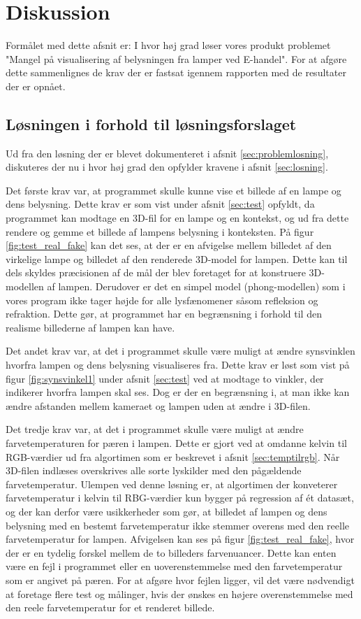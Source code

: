 \section{Diskussion}
\label{sec:diskussion}

Formålet med dette afsnit er: I hvor høj grad løser vores produkt problemet "Mangel på visualisering af belysningen fra lamper ved E-handel". For at afgøre dette sammenlignes de krav der er fastsat igennem rapporten med de resultater der er opnået. 

\subsection{Løsningen i forhold til løsningsforslaget}

Ud fra den løsning der er blevet dokumenteret i afsnit \ref{sec:problemlosning}, diskuteres der nu i hvor høj grad den opfylder kravene i afsnit \ref{sec:losning}. 

Det første krav var, at programmet skulle kunne vise et billede af en lampe og dens belysning. Dette krav er som vist under afsnit \ref{sec:test} opfyldt, da programmet kan modtage en 3D-fil for en lampe og en kontekst, og ud fra dette rendere og gemme et billede af lampens belysning i konteksten. På figur \ref{fig:test_real_fake} kan det ses, at der er en afvigelse mellem billedet af den virkelige lampe og billedet af den renderede 3D-model for lampen. Dette kan til dels skyldes præcisionen af de mål der blev foretaget for at konstruere 3D-modellen af lampen. Derudover er det en simpel model (phong-modellen) som i vores program ikke tager højde for alle lysfænomener såsom refleksion og refraktion. Dette gør, at programmet har en begrænsning i forhold til den realisme billederne af lampen kan have.

Det andet krav var, at det i programmet skulle være muligt at ændre synsvinklen hvorfra lampen og dens belysning visualiseres fra. Dette krav er løst som vist på figur \ref{fig:synsvinkel1} under afsnit \ref{sec:test} ved at modtage to vinkler, der indikerer hvorfra lampen skal ses. Dog er der en begrænsning i, at man ikke kan ændre afstanden mellem kameraet og lampen uden at ændre i 3D-filen. 

Det tredje krav var, at det i programmet skulle være muligt at ændre farvetemperaturen for pæren i lampen. Dette er gjort ved at omdanne kelvin til RGB-værdier ud fra algortimen som er beskrevet i afsnit \ref{sec:temptilrgb}. Når 3D-filen indlæses overskrives alle sorte lyskilder med den pågældende farvetemperatur. Ulempen ved denne løsning er, at algortimen der konveterer farvetemperatur i kelvin til RBG-værdier kun bygger på regression af ét datasæt, og der kan derfor være usikkerheder som gør, at billedet af lampen og dens belysning med en bestemt farvetemperatur ikke stemmer overens med den reelle farvetemperatur for lampen. Afvigelsen kan ses på figur \ref{fig:test_real_fake}, hvor der er en tydelig forskel mellem de to billeders farvenuancer. Dette kan enten være en fejl i programmet eller en uoverenstemmelse med den farvetemperatur som er angivet på pæren. For at afgøre hvor fejlen ligger, vil det være nødvendigt at foretage flere test og målinger, hvis der ønskes en højere overenstemmelse med den reele farvetemperatur for et renderet billede. 

